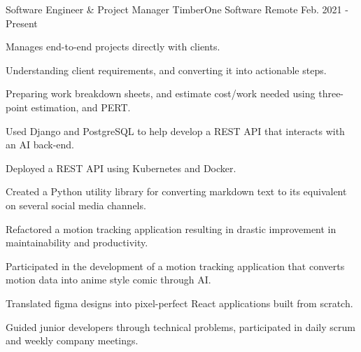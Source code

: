 

\begin{cventries}

  \cventry
    {Software Engineer \& Project Manager} %
    {TimberOne Software} %
    {Remote} %
    {Feb. 2021 - Present} %
    {
      \begin{cvitems} %
        \item {Manages end-to-end projects directly with clients.}
        \item {Understanding client requirements, and converting it into actionable steps.}
        \item {Preparing work breakdown sheets, and estimate cost/work needed using three-point estimation, and PERT.}
        \item {Used Django and PostgreSQL to help develop a REST API that interacts with an AI back-end.}
        \item {Deployed a REST API using Kubernetes and Docker.}
        \item {Created a Python utility library for converting markdown text to its equivalent on several social media channels.}
        \item {Refactored a motion tracking application resulting in drastic improvement in maintainability and productivity.}
        \item {Participated in the development of a motion tracking application that converts motion data into anime style comic through AI.}
        \item {Translated figma designs into pixel-perfect React applications built from scratch.}
        \item {Guided junior developers through technical problems, participated in daily scrum and weekly company meetings.}
      \end{cvitems}
    }


\end{cventries}
